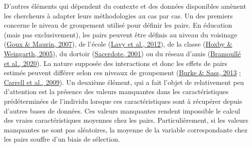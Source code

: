 \documentclass[
]{book}
\begin{document}
\quad D'autres éléments qui dépendent du contexte et des données disponibles amènent les chercheurs à adapter leurs méthodologies au cas par cas. Un des premiers concerne le niveau de groupement utilisé pour définir les pairs. En éducation (mais pas exclusivement), les pairs peuvent être définis au niveau du voisinage (\protect\hyperlink{ref-GOU:MAU:07}{Goux \& Maurin, 2007}), de l'école (\protect\hyperlink{ref-LAV:eal:12}{Lavy et al., 2012}), de la classe (\protect\hyperlink{ref-HOX:WEI:05}{Hoxby \& Weingarth, 2005}), du dortoir (\protect\hyperlink{ref-SAC:01}{Sacerdote, 2001}) ou du réseau d'amis (\protect\hyperlink{ref-BRA:eal:20}{Bramoullé et al., 2020}). La nature supposée des interactions et donc les effets de pairs estimés peuvent différer selon ces niveaux de groupement (\protect\hyperlink{ref-BUR:SAS:13}{Burke \& Sass, 2013} ; \protect\hyperlink{ref-CAR:eal:09}{Carrell et al., 2009}). Un deuxième élément, qui a fait l'objet de relativement peu d'attention est la présence des valeurs manquantes dans les caractéristiques prédéterminées de l'individu lorsque ces caractéristiques sont à récupérer depuis d'autres bases de données. Ces valeurs manquantes rendent impossible le calcul des vraies caractéristiques moyennes chez les pairs. Particulièrement, si les valeurs manquantes ne sont pas aléatoires, la moyenne de la variable correspondante chez les pairs souffre d'un biais de sélection.
\end{document}
